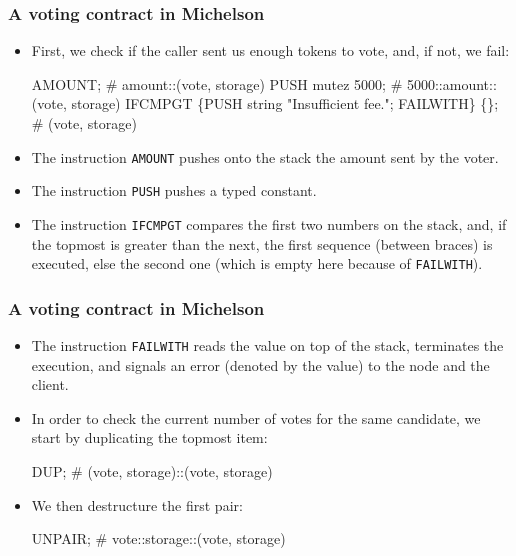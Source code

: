 \documentclass[compress,dvips,xcolor={dvipsnames},t]{beamer}
\begin{document}
\begin{frame}[containsverbatim]
  \frametitle{A voting contract in Michelson}

  \begin{itemize}

    \item First, we check if the caller sent us enough tokens to
      vote, and, if not, we fail:
\begin{semiverbatim}
AMOUNT;
# amount::(vote, storage)
PUSH mutez 5000;
# 5000::amount::(vote, storage)
IFCMPGT
  \{PUSH string "Insufficient fee."; FAILWITH\} \{\};
# (vote, storage)
\end{semiverbatim}

    \item The instruction \texttt{AMOUNT} pushes onto the stack the
      amount sent by the voter.

    \item The instruction \texttt{PUSH} pushes a typed constant.

    \item The instruction \texttt{IFCMPGT} compares the first two
      numbers on the stack, and, if the topmost is greater than the
      next, the first sequence (between braces) is executed, else the
      second one (which is empty here because of \texttt{FAILWITH}).

  \end{itemize}

\end{frame}

\begin{frame}[containsverbatim]
  \frametitle{A voting contract in Michelson}

  \begin{itemize}

    \item The instruction \texttt{FAILWITH} reads the value on top of
      the stack, terminates the execution, and signals an error
      (denoted by the value) to the node and the client.

    \item In order to check the current number of votes for the same
      candidate, we start by duplicating the topmost item:
\begin{semiverbatim}
DUP;
# (vote, storage)::(vote, storage)
\end{semiverbatim}

    \item We then destructure the first pair:
\begin{semiverbatim}
UNPAIR;
# vote::storage::(vote, storage)
\end{semiverbatim}

  \end{itemize}

\end{frame}
\end{document}
